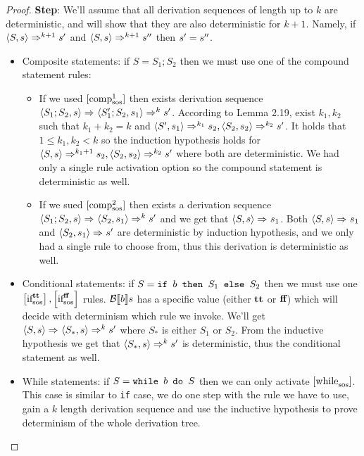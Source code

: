 \begin{proof}
\textbf{Step}: We'll assume that all derivation sequences of length up to $k$ are deterministic, and will show that they are also deterministic for $k+1$. Namely, if $\sosftrans[k+1]{S}{s}{s^\prime}$ and $\sosftrans[k+1]{S}{s}{s^\pprime}$ then $s^\prime = s^\pprime$.
\begin{itemize}
	\item Composite statements: if $S=S_1;S_2$ then we must use one of the compound statement rules:
	\begin{itemize}
		\item If we used $\sosrule[1]{comp}$ then exists derivation sequence $\sostrans{S_1;S_2}{s}{S_1^\prime;S_2}{s_1}\Rightarrow^{k}s^\prime$. According to Lemma 2.19, exist $k_1,k_2$ such that $k_1 + k_2 = k$ and $\sosftrans[k_1]{S^\prime}{s_1}{s_2}, \sosftrans[k_2]{S_2}{s_2}{s^\prime}$. It holds that $1\le k_1,k_2 < k$ so the induction hypothesis holds for $\sosftrans[k_1+1]{S}{s}{s_2}, \sosftrans[k_2]{S_2}{s_2}{s^\prime}$ where both are deterministic. We had only a single rule activation option so the compound statement is deterministic as well.
		\item If we sued $\sosrule[2]{comp}$ then exists a derivation sequence $\sostrans{S_1;S_2}{s}{S_2}{s_1}\Rightarrow^{k}s^\prime$ and we get that $\sosftrans{S}{s}{s_1}$. Both $\sosftrans{S}{s}{s_1}$ and $\sosftrans{S_2}{s_1}{s^\prime}$ are deterministic by induction hypothesis, and we only had a single rule to choose from, thus this derivation is deterministic as well.
	\end{itemize}
	\item Conditional statements: if $S=\sif{b}{S_1}{S_2}$ then we must use one $\sosrule[\true]{if}, \sosrule[\false]{if}$ rules. $\beval{b}{s}$ has a specific value (either $\true$ or $\false$) which will decide with determinism which rule we invoke. We'll get $\sostrans{S}{s}{S_{*}}{s}\Rightarrow^{k}s^\prime$ where $S_*$ is either $S_1$ or $S_2$. From the inductive hypothesis we get that $\sosftrans[k]{S_*}{s}{s^\prime}$ is deterministic, thus the conditional statement as well.
	\item While statements: if $S=\swhile{b}{S}$ then we can only activate $\sosrule{while}$. This case is similar to \texttt{if} case, we do one step with the rule we have to use, gain a $k$ length derivation sequence and use the inductive hypothesis to prove determinism of the whole derivation tree.
\end{itemize}
\end{proof}